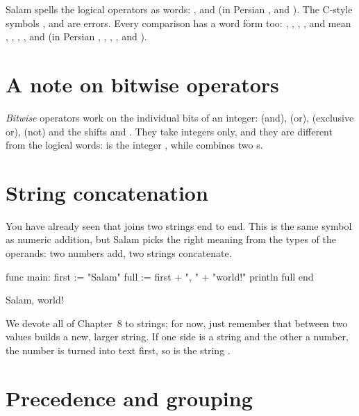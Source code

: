 \begin{note}
Salam spells the logical operators as words: ,  and
 (in Persian ,  and ).
The C-style symbols \code{\&\&}, \code{||} and \code{!} are errors.
Every comparison has a word form too: , , ,
,  and  mean \code{==}, \code{!=}, \code{<},
\code{>}, \code{<=} and \code{>=} (in Persian ,
, , ,
 and ).
\end{note}

\section{A note on bitwise operators}

\emph{Bitwise} operators work on the individual bits of an integer:
\code{\&} (and), \code{|} (or), \code{\textasciicircum} (exclusive or), \code{\textasciitilde} (not)
and the shifts \code{<<} and \code{>>}. They take integers only, and they are
different from the logical words:  is the integer , while
 combines two s.

\section{String concatenation}

You have already seen that \code{+} joins two strings end to end. This is the
same \code{+} symbol as numeric addition, but Salam picks the right meaning from
the types of the operands: two numbers add, two strings concatenate.

\begin{salamen}
func main:
    first := "Salam"
    full := first + ", " + "world!"
    println full
end
\end{salamen}

\begin{progout}
Salam, world!
\end{progout}

We devote all of Chapter~8 to strings; for now, just remember that \code{+}
between two  values builds a new, larger string. If one side is a
string and the other a number, the number is turned into text first, so
 is the string .

\section{Precedence and grouping}

